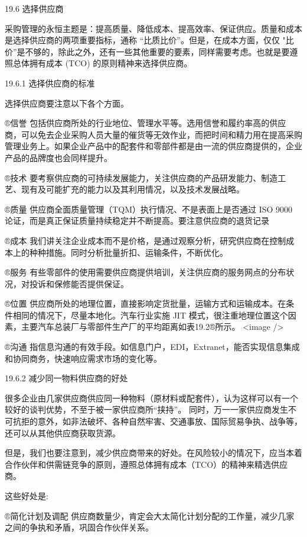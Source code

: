 19.6 选择供应商

    采购管理的永恒主题是：提高质量、降低成本、提高效率、保证供应。质量和成本是选择供应商的两项重要指标，通称 “比质比价”。但是，在成本方面，仅仅 "比价”是不够的，除此之外，还有一些其他重要的要素，同样需要考虑。也就是要遵照总体拥有成本 (TCO) 的原则精神来选择供应商。

19.6.1 选择供应商的标准

    选择供应商要注意以下各个方面。

    ®信誉 包括供应商所处的行业地位、管理水平等。选用信誉和履约率高的供应商，可以免去企业采购人员大量的催货等无效作业，而把时间和精力用在提高采购管理业务上。如果企业产品中的配套件和零部件都是由一流的供应商提供的，企业产品的品牌度也会同样提升。

    ®技术 要考察供应商的可持续发展能力，关注供应商的产品研发能力、制造工艺、现有及可能扩充的能力以及其利用情况，以及技术发展战略。

    ®质量 供应商全面质量管理（TQM）执行情况、不是表面上是否通过 ISO 9000 论证，而是真正保证质量持续稳定并不断提高。要注意供应商的退货记录

    ®成本 我们讲关注企业成本而不是价格，是通过观察分析，研究供应商在控制成本上的种种措施。同时分析批量折扣、运输条件，不断优化。

    ®服务 有些零部件的使用需要供应商提供培训，关注供应商的服务网点的分布状况，对投诉和保修能否提供保证。

    ®位置 供应商所处的地理位置，直接影响定货批量，运输方式和运输成本。在条件相同的情况下，尽量本地化。汽车行业实施 JIT 模式，很注重地理位置这个因素，主要汽车总装厂与零部件生产厂的平均距离如表19.2®所示。
    <image />

    ®沟通 指信息沟通的有效手段。如信息门户，EDI，Extranet，能否实现信息集成和协同商务，快速响应需求市场的变化等。

19.6.2 减少同一物料供应商的好处

    很多企业由几家供应商供应同一种物料（原材料或配套件），认为这样可以有一个较好的谈判优势，不至于被一家供应商所“挟持”。 同时，万一一家供应商发生不可抗拒的意外，如非法破坏、各种自然牢害、交通事放、国际贸易争执、战争等，还可以从其他供应商获取货源。

    但是，我们也要注意到，减少供应商带来的好处。在风险较小的情况下，应当本着合作伙伴和供需链竞争的原则，遵照总体拥有成本（TCO）的精神来精选供应商。

这些好处是:

    ®简化计划及调配 供应商数量少，肯定会大太简化计划分配的工作量，减少几家之间的争执和矛盾，巩固合作伙伴关系。

